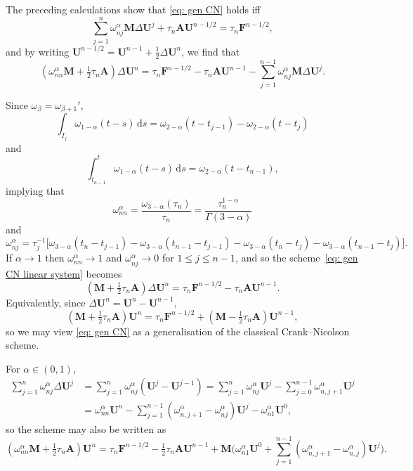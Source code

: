 \documentclass[a4paper,12pt]{article}
\newcommand{\bs}[1]{\boldsymbol{#1}}
\newcommand{\ud}{\mathrm{d}}
\begin{document}
The preceding calculations show that \eqref{eq: gen CN} holds iff
\[
\sum_{j=1}^n\omega_{nj}^\alpha\bs{M}\Delta\bs{U}^j
    +\tau_n\bs{A}\bs{U}^{n-1/2}=\tau_n\bs{F}^{n-1/2},
\]
and by writing $\bs{U}^{n-1/2}=\bs{U}^{n-1}+\tfrac12\Delta\bs{U}^n$, we find
that
\begin{equation}\label{eq: gen CN linear system}
(\omega_{nn}^\alpha\bs{M}+\tfrac12\tau_n\bs{A})\Delta\bs{U}^n
    =\tau_n\bs{F}^{n-1/2}-\tau_n\bs{A}\bs{U}^{n-1}
    -\sum_{j=1}^{n-1}\omega_{nj}^\alpha\bs{M}\Delta\bs{U}^j.
\end{equation}

Since $\omega_\beta=\omega_{\beta+1}'$,
\[
\int_{I_j}\omega_{1-\alpha}(t-s)\,\ud s
    =\omega_{2-\alpha}(t-t_{j-1})-\omega_{2-\alpha}(t-t_j)
\]
and
\[
\int_{t_{n-1}}^t\omega_{1-\alpha}(t-s)\,\ud s=\omega_{2-\alpha}(t-t_{n-1}),
\]
implying that
\[
\omega^\alpha_{nn}=\frac{\omega_{3-\alpha}(\tau_n)}{\tau_n}
    =\frac{\tau_n^{1-\alpha}}{\Gamma(3-\alpha)}
\]
and
\[
\omega^\alpha_{nj}=\tau_j^{-1}\bigl[
\omega_{3-\alpha}(t_n-t_{j-1})-\omega_{3-\alpha}(t_{n-1}-t_{j-1})
-\omega_{3-\alpha}(t_n-t_j)-\omega_{3-\alpha}(t_{n-1}-t_j)\bigr].
\]
If $\alpha\to1$ then $\omega^\alpha_{nn}\to1$ and
$\omega^\alpha_{nj}\to0$ for $1\le j\le n-1$, and so the
scheme~\eqref{eq: gen CN linear system} becomes
\[
(\bs{M}+\tfrac12\tau_n\bs{A})\Delta\bs{U}^n=\tau_n\bs{F}^{n-1/2}
    -\tau_n\bs{A}\bs{U}^{n-1}.
\]
Equivalently, since $\Delta\bs{U}^n=\bs{U}^n-\bs{U}^{n-1}$,
\[
(\bs{M}+\tfrac12\tau_n\bs{A})\bs{U}^n=\tau_n\bs{F}^{n-1/2}
    +(\bs{M}-\tfrac12\tau_n\bs{A})\bs{U}^{n-1},
\]
so we may view \eqref{eq: gen CN} as a generalisation of the classical
Crank--Nicolson scheme.

For $\alpha\in(0,1)$,
\begin{align*}
\sum_{j=1}^n\omega^\alpha_{nj}\Delta\bs{U}^j
    &=\sum_{j=1}^n\omega^\alpha_{nj}(\bs{U}^j-\bs{U}^{j-1})
    =\sum_{j=1}^n\omega^\alpha_{nj}\bs{U}^j
    -\sum_{j=0}^{n-1}\omega^\alpha_{n,j+1}\bs{U}^j\\
    &=\omega^\alpha_{nn}\bs{U}^n
    -\sum_{j=1}^{n-1}(\omega^\alpha_{n,j+1}-\omega^\alpha_{nj})\bs{U}^j
    -\omega^\alpha_{n1}\bs{U}^0,
\end{align*}
so the scheme may also be written as
\begin{equation}\label{eq: full scheme}
(\omega^\alpha_{nn}\bs{M}+\tfrac12\tau_n\bs{A})\bs{U}^n
=\tau_n\bs{F}^{n-1/2}-\tfrac12\tau_n\bs{A}\bs{U}^{n-1}
    +\bs{M}\biggl(\omega_{n1}^\alpha\bs{U}^0
    +\sum_{j=1}^{n-1}(\omega^\alpha_{n,j+1}-\omega^\alpha_{n,j})\bs{U}^j\biggr).
\end{equation}
\end{document}
